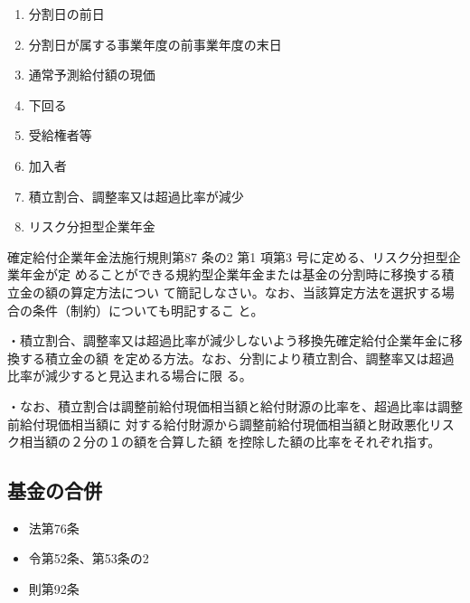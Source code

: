 \begin{answerbox}
  \begin{enumerate}[A: ]
    \item 分割日の前日
    \item 分割日が属する事業年度の前事業年度の末日
    \item 通常予測給付額の現価
    \item 下回る
    \item 受給権者等
    \item 加入者
    \item 積立割合、調整率又は超過比率が減少
    \item リスク分担型企業年金
  \end{enumerate}
\end{answerbox}

\begin{shortanswer}[年金1 2021 問題2(1)\textcircled{4}]
  確定給付企業年金法施行規則第87 条の2 第1 項第3 号に定める、リスク分担型企業年金が定
めることができる規約型企業年金または基金の分割時に移換する積立金の額の算定方法につい
て簡記しなさい。なお、当該算定方法を選択する場合の条件（制約）についても明記するこ
と。
\end{shortanswer}

\begin{answerbox}
  ・積立割合、調整率又は超過比率が減少しないよう移換先確定給付企業年金に移換する積立金の額
を定める方法。なお、分割により積立割合、調整率又は超過比率が減少すると見込まれる場合に限
る。

・なお、積立割合は調整前給付現価相当額と給付財源の比率を、超過比率は調整前給付現価相当額に
対する給付財源から調整前給付現価相当額と財政悪化リスク相当額の２分の１の額を合算した額
を控除した額の比率をそれぞれ指す。
\end{answerbox}

\newpage

\subsection{基金の合併}

\begin{InyouJobunbox}
  \begin{itemize}
    \item 法第76条
    \item 令第52条、第53条の2
    \item 則第92条
  \end{itemize}
\end{InyouJobunbox}


